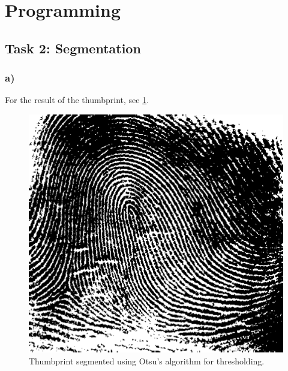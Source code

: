 \section{Programming}
\subsection{Task 2: Segmentation}
\subsubsection*{a)}
For the result of the thumbprint, see \cref{fig:thumbprint_segmented}.
\begin{figure}[]
    \centering
    \includegraphics[width=1.00\textwidth]{figures/image_processed/thumbprint-segmented.png}
    \caption{Thumbprint segmented using Otsu's algorithm for thresholding. }
    \label{fig:thumbprint_segmented}
\end{figure}

